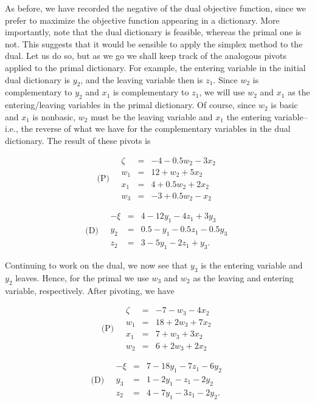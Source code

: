 \documentclass{article}
\begin{document}
As before, we have recorded the negative of the dual objective function, since we prefer to maximize the objective function appearing in a dictionary. More importantly, note that the dual dictionary is feasible, whereas the primal one is not. This suggests that it would be sensible to apply the simplex method to the dual. Let us do so, but as we go we shall keep track of the analogous pivots applied to the primal dictionary. For example, the entering variable in the initial dual dictionary is $y_{2}$, and the leaving variable then is $z_{1}$. Since $w_{2}$ is complementary to $y_{2}$ and $x_{1}$ is complementary to $z_{1}$, we will use $w_{2}$ and $x_{1}$ as the entering/leaving variables in the primal dictionary. Of course, since $w_{2}$ is basic and $x_{1}$ is nonbasic, $w_{2}$ must be the leaving variable and $x_{1}$ the entering variable--i.e., the reverse of what we have for the complementary variables in the dual dictionary. The result of these pivots is

\[
\text{(P)} \quad 
\begin{array}{rcl}
\zeta &=& -4 - 0.5w_{2} - 3x_{2} \\
w_{1} &=& 12 + w_{2} + 5x_{2} \\
x_{1} &=& 4 + 0.5w_{2} + 2x_{2} \\
w_{3} &=& -3 + 0.5w_{2} - x_{2}
\end{array}
\]

\[
\text{(D)} \quad 
\begin{array}{rcl}
-\xi &=& 4 - 12y_{1} - 4z_{1} + 3y_{3} \\
y_{2} &=& 0.5 - y_{1} - 0.5z_{1} - 0.5y_{3} \\
z_{2} &=& 3 - 5y_{1} - 2z_{1} + y_{3}.
\end{array}
\]

Continuing to work on the dual, we now see that $y_{3}$ is the entering variable and $y_{2}$ leaves. Hence, for the primal we use $w_{3}$ and $w_{2}$ as the leaving and entering variable, respectively. After pivoting, we have

\[
\text{(P)} \quad 
\begin{array}{rcl}
\zeta &=& -7 - w_{3} - 4x_{2} \\
w_{1} &=& 18 + 2w_{3} + 7x_{2} \\
x_{1} &=& 7 + w_{3} + 3x_{2} \\
w_{2} &=& 6 + 2w_{3} + 2x_{2}
\end{array}
\]

\[
\text{(D)} \quad 
\begin{array}{rcl}
-\xi &=& 7 - 18y_{1} - 7z_{1} - 6y_{2} \\
y_{3} &=& 1 - 2y_{1} - z_{1} - 2y_{2} \\
z_{2} &=& 4 - 7y_{1} - 3z_{1} - 2y_{2}.
\end{array}
\]
\end{document}
